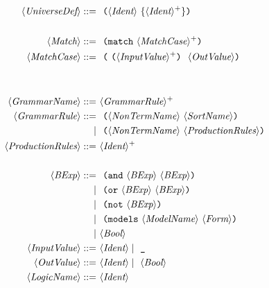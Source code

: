 \begin{align*}
     \UniverseDef         ::=~       & \Lparen\Ident~\{ \Ident^+ \}\Rparen                                                    \\
     \\
     \Match               ::=~       & \Lparen\texttt{match}~\MatchCase^+\Rparen                                              \\
     \MatchCase           ::=~       & \Lparen\Lparen\InputValue^+\Rparen~\OutValue\Rparen                                    \\                                                      \\
     \\
     \Grammar             ::=~       & \GrammarRule^+                                                                         \\
     \GrammarRule         ::=~       & \Lparen\NonTermName~\Sort\Rparen                                                             \\
     \mid~                           & \Lparen\NonTermName~\ProductionRules\Rparen                                                  \\
     \ProductionRules     ::=~       & \Ident^+                                                                               \\
     \\
     \Bexp                 ::=~      & \Lparen\And~\Bexp~\Bexp\Rparen                                                         \\
     \mid~                           & \Lparen\Or~\Bexp~\Bexp\Rparen                                                          \\
     \mid~                           & \Lparen\Not~\Bexp\Rparen                                                               \\
     \mid~                           & \Lparen\texttt{models}~\Model~\Form\Rparen                                             \\
     \mid~                           & \Bool
     \\
     \InputValue                ::=~ & \Ident \mid~\texttt{\_}                                                                \\
     \OutValue ::=~                  & \Ident \mid~\Bool                                                                      \\
     \Logic               ::=~       & \Ident                                                                                 \\

\end{align*}
